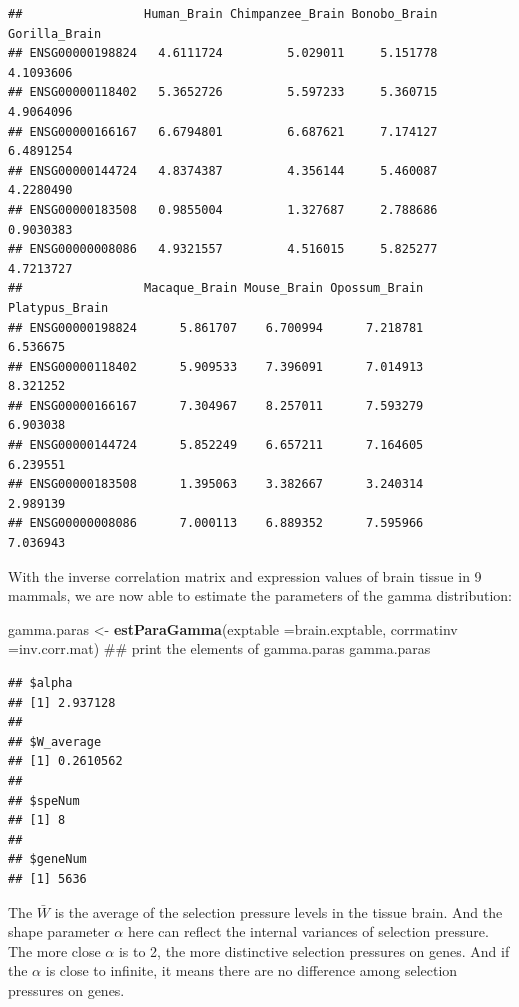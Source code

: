 \documentclass[]{book}
\newenvironment{Shaded}{\begin{snugshade}}{\end{snugshade}}
\newcommand{\DataTypeTok}[1]{\textcolor[rgb]{0.13,0.29,0.53}{#1}}
\newcommand{\KeywordTok}[1]{\textcolor[rgb]{0.13,0.29,0.53}{\textbf{#1}}}
\newcommand{\NormalTok}[1]{#1}
\newcommand{\StringTok}[1]{\textcolor[rgb]{0.31,0.60,0.02}{#1}}
\begin{document}
\begin{verbatim}
##                 Human_Brain Chimpanzee_Brain Bonobo_Brain Gorilla_Brain
## ENSG00000198824   4.6111724         5.029011     5.151778     4.1093606
## ENSG00000118402   5.3652726         5.597233     5.360715     4.9064096
## ENSG00000166167   6.6794801         6.687621     7.174127     6.4891254
## ENSG00000144724   4.8374387         4.356144     5.460087     4.2280490
## ENSG00000183508   0.9855004         1.327687     2.788686     0.9030383
## ENSG00000008086   4.9321557         4.516015     5.825277     4.7213727
##                 Macaque_Brain Mouse_Brain Opossum_Brain Platypus_Brain
## ENSG00000198824      5.861707    6.700994      7.218781       6.536675
## ENSG00000118402      5.909533    7.396091      7.014913       8.321252
## ENSG00000166167      7.304967    8.257011      7.593279       6.903038
## ENSG00000144724      5.852249    6.657211      7.164605       6.239551
## ENSG00000183508      1.395063    3.382667      3.240314       2.989139
## ENSG00000008086      7.000113    6.889352      7.595966       7.036943
\end{verbatim}

With the inverse correlation matrix and expression values of brain tissue in 9 mammals, we are now able to estimate the parameters of the gamma distribution:

\begin{Shaded}
\begin{Highlighting}[]
\NormalTok{gamma.paras <-}\StringTok{ }\KeywordTok{estParaGamma}\NormalTok{(}\DataTypeTok{exptable =}\NormalTok{brain.exptable, }\DataTypeTok{corrmatinv =}\NormalTok{inv.corr.mat)}
\NormalTok{## print the elements of gamma.paras}
\NormalTok{gamma.paras}
\end{Highlighting}
\end{Shaded}

\begin{verbatim}
## $alpha
## [1] 2.937128
## 
## $W_average
## [1] 0.2610562
## 
## $speNum
## [1] 8
## 
## $geneNum
## [1] 5636
\end{verbatim}

The \(\bar{W}\) is the average of the selection pressure levels in the tissue brain.
And the shape parameter \(\alpha\) here can reflect the internal variances of selection pressure. The more close \(\alpha\) is to 2, the more distinctive selection pressures on genes. And if the \(\alpha\) is close to infinite, it means there are no difference among selection pressures on genes.
\end{document}
